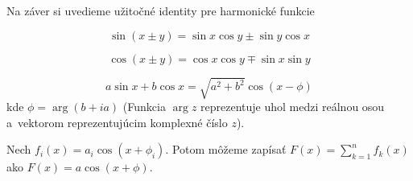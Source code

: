 Na záver si uvedieme užitočné identity pre harmonické funkcie
\begin{lema}
    \begin{equation*}
        \sin(x\pm y) = \sin x \cos y \pm \sin y \cos x
    \end{equation*}
\end{lema}

\begin{lema}
    \begin{equation*}
        \cos(x\pm y) = \cos x \cos y \mp \sin x \sin y
    \end{equation*}
\end{lema}

\begin{lema}
    \begin{equation*}
        a \sin x + b \cos x = \sqrt{a^2 + b^2} \cos (x - \phi)
    \end{equation*}
    kde $\phi = \arg (b + i a)$ (Funkcia $\arg z$ reprezentuje
    uhol medzi reálnou osou a~vektorom reprezentujúcim komplexné číslo
    $z$).
    \label{lema:lk_sin_cos}
\end{lema}
\begin{lema}
    Nech $f_i(x) = a_i \cos (x + \phi_i)$.
    Potom môžeme zapísať $F(x) = \sum_{k=1}^n f_k(x)$ ako
    $F(x) = a \cos (x + \phi)$.
    \label{lema:lk_harmonickych_funkcii}
\end{lema}
